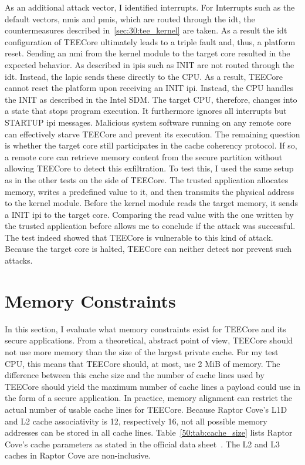 As an additional attack vector, I identified interrupts. For Interrupts such as
the default vectors, \glspl{nmi} and \glspl{pmi}, which are routed through the
\gls{idt}, the countermeasures described in~\ref{sec:30:tee_kernel} are taken.
As a result the \gls{idt} configuration of TEECore ultimately leads to a triple
fault and, thus, a platform reset. Sending an \gls{nmi} from the kernel module
to the target core resulted in the expected behavior. As described in
 \glspl{ipi} such as INIT are not routed through the \gls{idt}.
Instead, the \gls{lapic} sends these directly to the CPU. As a result, TEECore
cannot reset the platform upon receiving an INIT \gls{ipi}. Instead, the CPU
handles the INIT as described in the Intel SDM. The target CPU, therefore,
changes into a state that stops program execution. It furthermore ignores all
interrupts but STARTUP \gls{ipi} messages. Malicious system software running on
any remote core can effectively starve TEECore and prevent its execution. The
remaining question is whether the target core still participates in the cache
coherency protocol. If so, a remote core can retrieve memory content from the
secure partition without allowing TEECore to detect this exfiltration. To test
this, I used the same setup as in the other tests on the side of TEECore. The
trusted application allocates memory, writes a predefined value to it, and then
transmits the physical address to the kernel module. Before the kernel module
reads the target memory, it sends a INIT \gls{ipi} to the target core. Comparing
the read value with the one written by the trusted application before allows me
to conclude if the attack was successful. The test indeed showed that TEECore is
vulnerable to this kind of attack. Because the target core is halted, TEECore
can neither detect nor prevent such attacks.

\section{Memory Constraints}
\label{eval:mem_constraints}
In this section, I evaluate what memory constraints exist for TEECore and its
secure applications. From a theoretical, abstract point of view, TEECore should
not use more memory than the size of the largest private cache. For my test CPU,
this means that TEECore should, at most, use 2 MiB of memory. The difference
between this cache size and the number of cache lines used by TEECore should
yield the maximum number of cache lines a payload could use in the form of a
secure application. In practice, memory alignment can restrict the actual number
of usable cache lines for TEECore. Because Raptor Cove's L1D and L2 cache
associativity is 12, respectively 16, not all possible memory addresses can be
stored in all cache lines. Table~\ref{50:tab:cache_size} lists Raptor Cove's
cache parameters as stated in the official data
sheet~\cite{raptorlake_spec_sheet}. The L2 and L3 caches in Raptor Cove are
non-inclusive.\\

